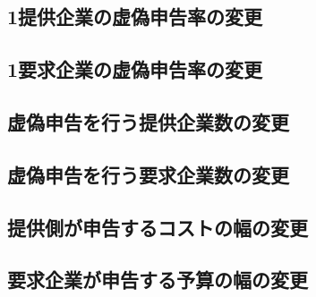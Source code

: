 \hypertarget{ux63d0ux4f9bux4f01ux696dux306eux865aux507dux7533ux544aux7387ux306eux5909ux66f4-1}{%
\subsection{1提供企業の虚偽申告率の変更}\label{ux63d0ux4f9bux4f01ux696dux306eux865aux507dux7533ux544aux7387ux306eux5909ux66f4-1}}

\hypertarget{ux8981ux6c42ux4f01ux696dux306eux865aux507dux7533ux544aux7387ux306eux5909ux66f4-1}{%
\subsection{1要求企業の虚偽申告率の変更}\label{ux8981ux6c42ux4f01ux696dux306eux865aux507dux7533ux544aux7387ux306eux5909ux66f4-1}}

\hypertarget{ux865aux507dux7533ux544aux3092ux884cux3046ux63d0ux4f9bux4f01ux696dux6570ux306eux5909ux66f4-1}{%
\subsection{虚偽申告を行う提供企業数の変更}\label{ux865aux507dux7533ux544aux3092ux884cux3046ux63d0ux4f9bux4f01ux696dux6570ux306eux5909ux66f4-1}}

\hypertarget{ux865aux507dux7533ux544aux3092ux884cux3046ux8981ux6c42ux4f01ux696dux6570ux306eux5909ux66f4-1}{%
\subsection{虚偽申告を行う要求企業数の変更}\label{ux865aux507dux7533ux544aux3092ux884cux3046ux8981ux6c42ux4f01ux696dux6570ux306eux5909ux66f4-1}}

\hypertarget{ux63d0ux4f9bux5074ux304cux7533ux544aux3059ux308bux30b3ux30b9ux30c8ux306eux5e45ux306eux5909ux66f4-1}{%
\subsection{提供側が申告するコストの幅の変更}\label{ux63d0ux4f9bux5074ux304cux7533ux544aux3059ux308bux30b3ux30b9ux30c8ux306eux5e45ux306eux5909ux66f4-1}}

\hypertarget{ux8981ux6c42ux4f01ux696dux304cux7533ux544aux3059ux308bux4e88ux7b97ux306eux5e45ux306eux5909ux66f4-1}{%
\subsection{要求企業が申告する予算の幅の変更}\label{ux8981ux6c42ux4f01ux696dux304cux7533ux544aux3059ux308bux4e88ux7b97ux306eux5e45ux306eux5909ux66f4-1}}

